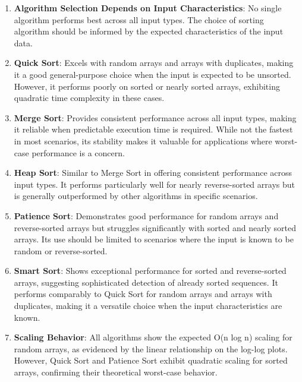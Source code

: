 \documentclass[a4paper,12pt]{article}
\begin{document}
\begin{enumerate}
\item \textbf{Algorithm Selection Depends on Input Characteristics}: No single algorithm performs best across all input types. The choice of sorting algorithm should be informed by the expected characteristics of the input data.

\item \textbf{Quick Sort}: Excels with random arrays and arrays with duplicates, making it a good general-purpose choice when the input is expected to be unsorted. However, it performs poorly on sorted or nearly sorted arrays, exhibiting quadratic time complexity in these cases.

\item \textbf{Merge Sort}: Provides consistent performance across all input types, making it reliable when predictable execution time is required. While not the fastest in most scenarios, its stability makes it valuable for applications where worst-case performance is a concern.

\item \textbf{Heap Sort}: Similar to Merge Sort in offering consistent performance across input types. It performs particularly well for nearly reverse-sorted arrays but is generally outperformed by other algorithms in specific scenarios.

\item \textbf{Patience Sort}: Demonstrates good performance for random arrays and reverse-sorted arrays but struggles significantly with sorted and nearly sorted arrays. Its use should be limited to scenarios where the input is known to be random or reverse-sorted.

\item \textbf{Smart Sort}: Shows exceptional performance for sorted and reverse-sorted arrays, suggesting sophisticated detection of already sorted sequences. It performs comparably to Quick Sort for random arrays and arrays with duplicates, making it a versatile choice when the input characteristics are known.

\item \textbf{Scaling Behavior}: All algorithms show the expected O(n log n) scaling for random arrays, as evidenced by the linear relationship on the log-log plots. However, Quick Sort and Patience Sort exhibit quadratic scaling for sorted arrays, confirming their theoretical worst-case behavior.


\end{enumerate}
\end{document}
